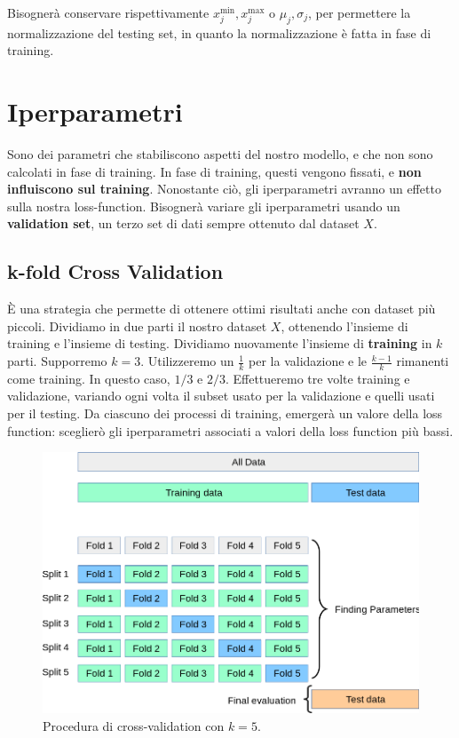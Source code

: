 Bisognerà conservare rispettivamente $x_j^{\min }, x_j^{\max }$ o $\mu_j, \sigma_j$, per permettere la normalizzazione del testing set, in quanto la normalizzazione è fatta in fase di training.

\section{Iperparametri}
Sono dei parametri che stabiliscono aspetti del nostro modello, e che non sono calcolati in fase di training.
In fase di training, questi vengono fissati, e \textbf{non influiscono sul training}. Nonostante ciò, gli iperparametri avranno un effetto sulla nostra loss-function. Bisognerà variare gli iperparametri usando un \textbf{validation set}, un terzo set di dati sempre ottenuto dal dataset $X$.

\subsection{k-fold Cross Validation}
È una strategia che permette di ottenere ottimi risultati anche con dataset più piccoli. Dividiamo in due parti il nostro dataset $X$, ottenendo l'insieme di training e l'insieme di testing. Dividiamo nuovamente l'insieme di \textbf{training }in $k$ parti. Supporremo $k=3$. Utilizzeremo un $\frac{1}{k}$ per la validazione e le $\frac{k-1}{k}$ rimanenti come training. In questo caso, $1/3$ e $2/3$. Effettueremo tre volte training e validazione, variando ogni volta il subset usato per la validazione e quelli usati per il testing. Da ciascuno dei processi di training, emergerà un valore della loss function: sceglierò gli iperparametri associati a valori della loss function più bassi.

\begin{figure}[htbp]
	\centering
	\includegraphics[width=\textwidth]{images/cross_validation.png}
	\caption{Procedura di cross-validation con $k=5$.}
	\label{fig:featureExtraction}
\end{figure}


